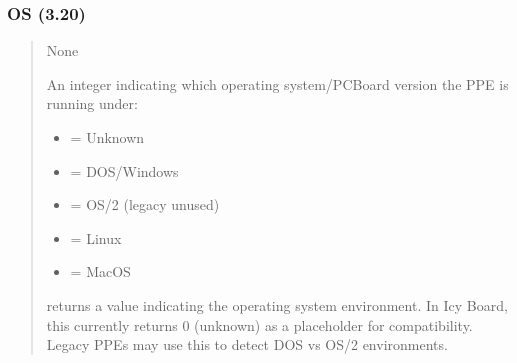 \documentclass[letterpaper,10pt,english]{sphinxmanual}
\begin{document}
\subsubsection{OS (3.20)}
\label{\detokenize{ppl:os-3-20}}\begin{quote}

\sphinxAtStartPar
{}
\begin{description}
\sphinxAtStartPar
None

\sphinxAtStartPar
An integer indicating which operating system/PCBoard version the PPE is running under:
\begin{itemize}
\item {} 
 = Unknown

\item {} 
 = DOS/Windows

\item {} 
 = OS/2 (legacy \sphinxhyphen{} unused)

\item {} 
 = Linux

\item {} 
 = MacOS

\end{itemize}

\sphinxAtStartPar
{} returns a value indicating the operating system environment.
In Icy Board, this currently returns 0 (unknown) as a placeholder for
compatibility. Legacy PPEs may use this to detect DOS vs OS/2 environments.

\begin{sphinxVerbatim}[commandchars=\\\{\}]
  
     
         
     
         
     
         
 
\end{sphinxVerbatim}

\end{description}
\end{quote}
\end{document}
